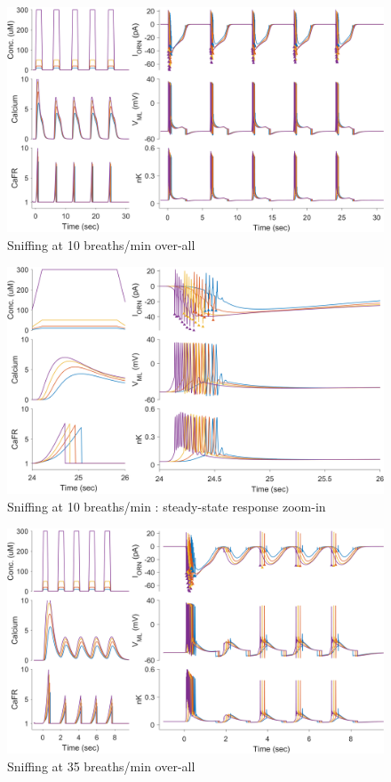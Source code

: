 \documentclass[
]{article}
\begin{document}
\begin{figure}

{\centering \includegraphics[width=0.9\linewidth]{figs/sniff/fig_spk_sniffing_10bpm} 

}

\caption{Sniffing at 10 breaths/min over-all}\label{fig:f10bpm}
\end{figure}

\begin{figure}

{\centering \includegraphics[width=0.9\linewidth]{figs/sniff/fig_spk_sniffing_10bpm_last} 

}

\caption{Sniffing at 10 breaths/min : steady-state response zoom-in}\label{fig:f10bpmSS}
\end{figure}

\begin{figure}

{\centering \includegraphics[width=0.9\linewidth]{figs/sniff/fig_spk_sniffing_35bpm} 

}

\caption{Sniffing at 35 breaths/min over-all}\label{fig:f35bpm}
\end{figure}
\end{document}
